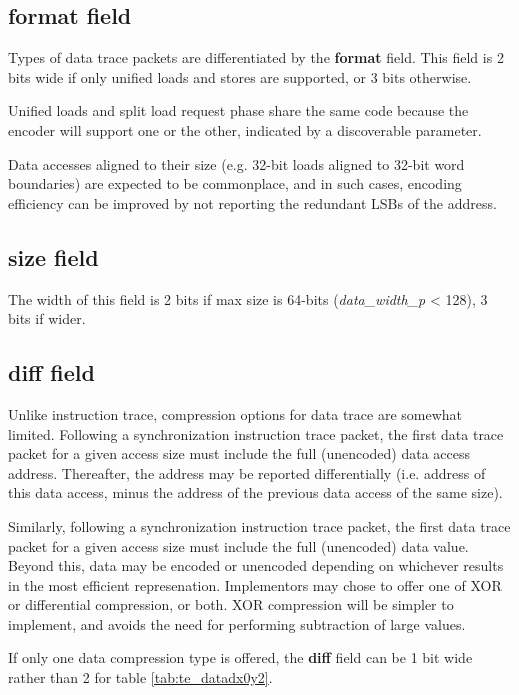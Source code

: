\subsection{format field} \label{sec:loadstore-format}

Types of data trace packets are differentiated by the \textbf{format} field.  This field is 2 bits wide if
only unified loads and stores are supported, or 3 bits otherwise.

Unified loads and split load request phase share the same code because the encoder will support one or the 
other, indicated by a discoverable parameter.

Data accesses aligned to their size (e.g. 32-bit loads aligned to 32-bit word boundaries) are expected to
be commonplace, and in such cases, encoding efficiency can be improved by not reporting the redundant LSBs of the address.

\subsection{size field} \label{sec:loadstore-size}

The width of this field is 2 bits if max size is 64-bits (\textit{data\_width\_p} < 128), 3 bits if wider.

\subsection{diff field} \label{sec:loadstore-diff}

Unlike instruction trace, compression options for data trace are somewhat limited.
Following a synchronization instruction trace packet, the first data trace packet for a given access size must 
include the full (unencoded) data access address.  Thereafter, the address may be reported differentially (i.e. 
address of this data access, minus the address of the previous data access of the same size). 

Similarly, following a synchronization instruction trace packet, the first data trace packet for a given access size 
must include the full (unencoded) data value.  Beyond this, data may be encoded or unencoded depending on whichever
results in the most efficient represenation.  Implementors may chose to offer one of XOR or differential compression,
or both.  XOR compression will be simpler to implement, and avoids the need for performing subtraction of large 
values.

If only one data compression type is offered, the \textbf{diff} field can be 1 bit wide rather than 2 for table \ref{tab:te_datadx0y2}.

